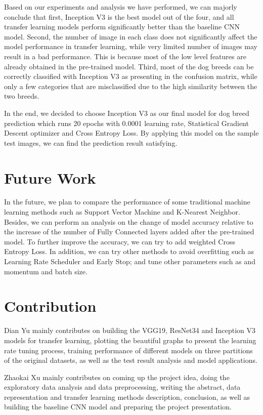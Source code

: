 \documentclass{article}
\begin{document}
Based on our experiments and analysis we have performed, we can majorly conclude that 
first, Inception V3 is the best model out of the four, and all transfer learning models perform significantly better than the baseline CNN model. Second, the number of image in each class does not significantly affect the model performance in transfer learning, while very limited number of images may result in a bad performance. This is because most of the low level features are already obtained in the pre-trained model. Third, most of the dog breeds can be correctly classified with Inception V3 as presenting in the confusion matrix, while only a few categories that are misclassified due to the high similarity between the two breeds. 

In the end, we decided to choose Inception V3 as our final model for dog breed prediction which runs 20 epochs with 0.0001 learning rate, Statistical Gradient Descent optimizer and Cross Entropy Loss. By applying this model on the sample test images, we can find the prediction result satisfying.

\section{Future Work}
In the future, we plan to compare the performance of some traditional machine learning methods such as Support Vector Machine and K-Nearest Neighbor. Besides, we can perform an analysis on the change of model accuracy relative to the increase of the number of Fully Connected layers added after the pre-trained model. To further improve the accuracy, we can try to add weighted Cross Entropy Loss. In addition, we can try other methods to avoid overfitting such as Learning Rate Scheduler and Early Stop; and tune other parameters such as and momentum and batch size.

\section{Contribution}
Dian Yu mainly contributes on building the VGG19, ResNet34 and Inception V3 models for transfer learning, plotting the beautiful graphs to present the learning rate tuning process, training performance of different models on three partitions of the original datasets, as well as the test result analysis and model applications. 

Zhaokai Xu mainly contributes on coming up the project idea, doing the exploratory data analysis and data preprocessing, writing the abstract, data representation and transfer learning methods description, conclusion, as well as building the baseline CNN model and preparing the project presentation.
\newpage

\end{document}
